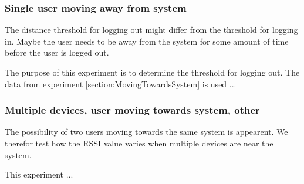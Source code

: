 \subsubsection{Single user moving away from system}
The distance threshold for logging out might differ from the threshold for logging in. Maybe the user needs to be away from the system for some amount of time before the user is logged out. 

The purpose of this experiment is to determine the threshold for logging out. The data from experiment \ref{section:MovingTowardsSystem} is used ...


\subsubsection{Multiple devices, user moving towards system, other}
The possibility of two users moving towards the same system is appearent. We therefor test how the RSSI value varies when multiple devices are near the system.

This experiment ...

